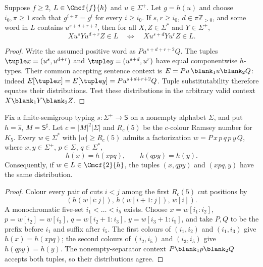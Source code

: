 \begin{lemma}
\label{lem:mcfg-power-transfer}
Suppose $f\ge2$, $L\in\Cmcf{f}{h}$ and $u\in\Sigma^+$.
Let $g=h(u)$ and choose $i_0,\pi\ge1$ such that
$g^{i+\pi}=g^i$ for every $i\ge i_0$.
If $s,r\ge i_0$, $d\in\pi\mathbb Z_{>0}$, and some
word in $L$ contains $u^{s+d+r+2}$, then for
all $X,Z\in\Sigma^*$ and $Y\in\Sigma^+$,
\[
 Xu^sYu^{d+r}Z\in L
 \quad\Longleftrightarrow\quad
 Xu^{s+d}Yu^rZ\in L.
\]
\end{lemma}
\begin{proof}
Write the assumed positive word as $Pu^{s+d+r+2}Q$.
The tuples $\tuple x=(u^s,u^{d+r})$ and
$\tuple y=(u^{s+d},u^r)$ have equal componentwise
$h$-types.  Their common accepting sentence context
is $E=Pu\,\blank_1u\blank_2Q$: indeed
$E[\tuple x]=E[\tuple y]=Pu^{s+d+r+2}Q$.
Tuple substitutability therefore equates their
distributions.  Test these distributions in the
arbitrary valid context $X\blank_1Y\blank_2Z$.
\end{proof}

\begin{lemma}
\label{lem:mcfg-local-shift}
Fix a finite-semigroup typing $s:\Sigma^+\to\mathsf S$ on a nonempty
alphabet $\Sigma$, and put $h=\widehat s$, $M=\mathsf S^\sharp$.
Let $c=|M|^2|\Sigma|$
and $R_c(5)$ be the
$c$-colour Ramsey number for $K_5$.
Every $w\in\Sigma^*$ with $|w|\ge R_c(5)$
admits a factorization
$w=P\,x\,p\,q\,p\,y\,Q$,
where $x,y\in\Sigma^+$, $p\in\Sigma$, $q\in\Sigma^*$,
\[
 h(x)=h(xpq),\qquad h(qpy)=h(y).
\]
Consequently, if $w\in L\in\Cmcf{2}{h}$, the tuples
$(x,qpy)$ and $(xpq,y)$ have the same distribution.
\end{lemma}
\begin{proof}
Colour every pair of cuts $i<j$ among the first
$R_c(5)$ cut positions by
\[
 (h(w[i:j]),\,h(w[i+1:j]),\,w[i]).
\]
A monochromatic five-set $i_1<\dots<i_5$ exists.
Choose $x=w[i_1:i_2]$, $p=w[i_2]=w[i_3]$,
$q=w[i_2+1:i_3]$,
$y=w[i_3+1:i_5]$, and take $P,Q$ to be
the prefix before $i_1$ and suffix after $i_5$.
The first colours of $(i_1,i_2)$ and $(i_1,i_3)$
give $h(x)=h(xpq)$; the second colours of
$(i_2,i_5)$ and $(i_3,i_5)$ give $h(qpy)=h(y)$.
The nonempty-separator context
$P\blank_1p\blank_2Q$ accepts both tuples,
so their distributions agree.
\end{proof}

